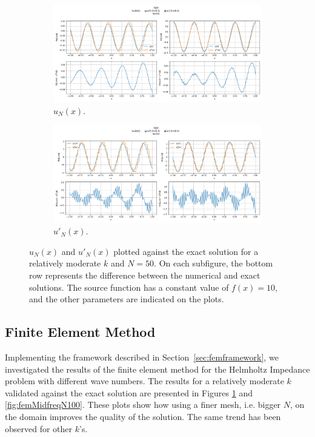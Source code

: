 \begin{figure}[h!]
    \centering
    \begin{subfigure}[b]{0.7\textwidth}
        \includegraphics[width=\textwidth]{img/FEM-Const-MidFreq-N0050-sol.png}
        \caption{$u_N(x)$.}
    \end{subfigure}
    \vfill
    \begin{subfigure}[b]{0.7\textwidth}
        \includegraphics[width=\textwidth]{img/FEM-Const-MidFreq-N0050-der.png}
        \caption{$u'_N(x)$.}
    \end{subfigure}
    \caption{$u_N(x)$ and $u'_N(x)$ plotted against the exact solution for a relatively moderate $k$ and $N=50$. On each subfigure, the bottom row represents the difference between the numerical and exact solutions. The source function has a constant value of $f(x)=10$, and the other parameters are indicated on the plots.}
    \label{fig:femMidfreqN050}
\end{figure}

\subsection{Finite Element Method}\label{sec:femresults}
Implementing the framework described in Section~\ref{sec:femframework}, we investigated the results of the finite element method for the Helmholtz Impedance problem with different wave numbers. The results for a relatively moderate $k$ validated against the exact solution are presented in Figures \ref{fig:femMidfreqN050} and \ref{fig:femMidfreqN100}. These plots show how using a finer mesh, i.e. bigger $N$, on the domain improves the quality of the solution. The same trend has been observed for other $k$'s.

